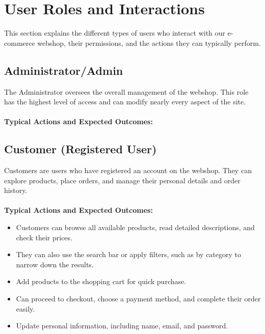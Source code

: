 \documentclass[a4paper,12pt]{article}
\begin{document}
	\section{User Roles and Interactions}
	This section explains the different types of users who interact with our e-commerce webshop, their permissions, and the actions they can typically perform.
	\subsection*{Administrator/Admin}
	The Administrator oversees the overall management of the webshop. This role has the highest level of access and can modify nearly every aspect of the site. \\ \\
	\textbf{Typical Actions and Expected Outcomes:}




	\subsection*{Customer (Registered User)}
	Customers are users who have registered an account on the webshop. They can explore products, place orders, and manage their personal details and order history. \\ \\
	\textbf{Typical Actions and Expected Outcomes:}
	\begin{itemize}
  		\item Customers can browse all available products, read detailed descriptions, and check their prices.
    		\item They can also use the search bar or apply filters, such as by category to narrow down the results.
    		\item Add products to the shopping cart for quick purchase.
    		\item Can proceed to checkout, choose a payment method, and complete their order easily.
    		\item Update personal information, including name, email, and password.
	\end{itemize}
\end{document}

